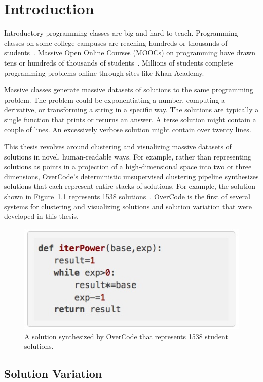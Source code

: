 \chapter{Introduction}\label{chapter:introduction}

Introductory programming classes are big and hard to teach. Programming classes on some college campuses are reaching hundreds or thousands of students~\cite{biggestClass}. Massive Open Online Courses (MOOCs) on programming have drawn tens or hundreds of thousands of students~\cite{codewebs}. Millions of students complete programming problems online through sites like Khan Academy.

Massive classes generate massive datasets of solutions to the same programming problem. The problem could be exponentiating a number, computing a derivative, or transforming a string in a specific way. The solutions are typically a single function that prints or returns an answer. A terse solution might contain a couple of lines. An excessively verbose solution might contain over twenty lines.

This thesis revolves around clustering and visualizing massive datasets of solutions in novel, human-readable ways. For example, rather than representing solutions as points in a projection of a high-dimensional space into two or three dimensions, OverCode's deterministic unsupervised clustering pipeline synthesizes solutions that each represent entire stacks of solutions. For example, the solution shown in Figure~\ref{largestStack} represents 1538 solutions~\cite{overcode}. OverCode is the first of several systems for clustering and visualizing solutions and solution variation that were developed in this thesis.

\begin{figure}
\centering
\includegraphics[width=0.5\linewidth]{Body/figures/overcode/largest_stack_cropped.jpg}
\caption{A solution synthesized by OverCode that represents 1538 student solutions.}
\label{largestStack}
\end{figure}

\section{Solution Variation}


